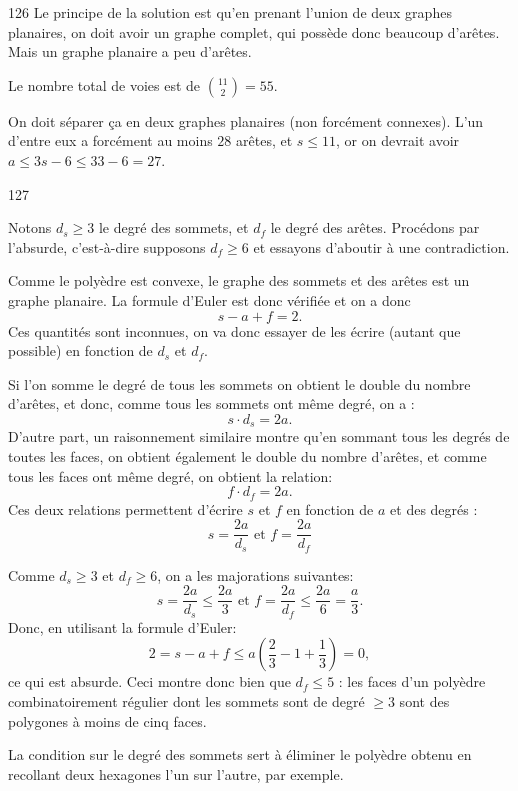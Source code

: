 \begin{Soln}{126}
Le principe de la solution est qu'en prenant l'union de deux graphes planaires, on doit avoir un graphe complet, qui possède donc beaucoup d'arêtes.
Mais un graphe planaire a \og peu\fg{} d'arêtes.



Le nombre total de voies est de $\binom{11}{2} = 55$.

On doit séparer ça en deux graphes planaires (non forcément connexes). L'un d'entre eux a forcément au moins $28$ arêtes, et $s\leq 11$, or on devrait avoir $a\leq 3s-6 \leq 33-6 = 27$.
\end{Soln}
\begin{Soln}{127}

Notons $d_s\geq 3$ le degré des sommets, et $d_f$ le degré des arêtes. Procédons par l'absurde, c'est-à-dire supposons $d_f\geq 6$ et essayons d'aboutir à une contradiction.


Comme le polyèdre est convexe, le graphe des sommets et des arêtes est un graphe planaire. La formule d'Euler est donc vérifiée et on a donc
\[s-a+f=2.\]
Ces quantités sont inconnues, on va donc essayer de les écrire (autant que possible) en fonction de $d_s$ et $d_f$.

Si l'on somme le degré de tous les sommets on obtient le double du nombre d'arêtes, et donc, comme tous les sommets ont même degré, on a :
\[ s\cdot d_s = 2a.\]
D'autre part,  un raisonnement similaire montre qu'en sommant tous les degrés de toutes les faces, on obtient également le double du nombre d'arêtes, et comme tous les faces ont même degré, on obtient la relation:
\[
f\cdot d_f = 2a.
\]
Ces deux relations permettent d'écrire $s$ et $f$ en fonction de $a$ et des degrés :
\[ s = \frac{2a}{d_s}\text{ et } f = \frac{2a}{d_f} \]

Comme $d_s\geq 3$ et $d_f\geq 6$, on a les majorations suivantes:
\[ s = \frac{2a}{d_s}\leq \frac{2a}{3} \text{ et } f = \frac{2a}{d_f} \leq \frac{2a}{6} = \frac{a}{3}. \]
Donc, en utilisant la formule d'Euler:
\[ 2=s-a+f  \leq a(\frac{2}{3} - 1 + \frac{1}{3}) = 0,
\]
ce qui est absurde. Ceci montre donc bien que $d_f\leq 5$ : les faces d'un polyèdre combinatoirement régulier dont les sommets sont de degré $\geq 3$ sont des polygones à moins de cinq faces.

La condition sur le degré des sommets sert à éliminer le \og polyèdre\fg{} obtenu en recollant deux hexagones l'un sur l'autre, par exemple.

\end{Soln}
